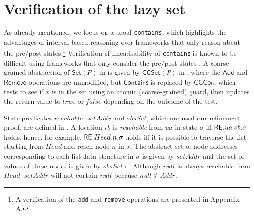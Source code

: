 \documentclass{article}
\def \reachable{{\sf RE}}
\theoremstyle{plain}
\theoremstyle{definition}
\begin{document}
\section{Verification of the lazy set}
\label{sec:verif-lazy-set}


As already mentioned, we focus on a proof {\tt contains}, which
highlights the advantages of interval-based reasoning over frameworks
that only reason about the pre/post states.\footnote{A verification of
  the {\tt add} and {\tt remove} operations are presented in Appendix
  A.}  Verification of linearisability of \texttt{contains} is known
to be difficult using frameworks that only consider the pre/post
states \cite{Vaf10,VHHS06,CGLM06,DSW11}. A coarse-grained abstraction
of $\mathsf{Set}(P)$ in  is given by
$\mathsf{CGSet}(P)$ in , where the $\mathsf{Add}$ and
$\mathsf{Remove}$ operations are unmodified, but $\mathsf{Contains}$
is replaced by $\mathsf{CGCon}$, which tests to see if $x$ is in the
set using an atomic (coarse-grained) guard, then updates the return
value to $true$ or $false$ depending on the outcome of the test.

State predicates $reachable$, $setAddr$ and $absSet$, which are used
our refinement proof, are defined in . A location
$vb$ is \emph{reachable} from $ua$ in state $\sigma$ iff
$\reachable.ua.vb.\sigma$ holds, hence, for example,
$\reachable.Head.n.\sigma$ holds iff it is possible to traverse the
list starting from $Head$ and reach node $n$ in $\sigma$. The abstract
set of node addresses corresponding to each list data structure in
$\sigma$ is given by $setAddr$ and the set of values of these nodes is
given by $absSet.\sigma$. Although $null$ is always reachable from
$Head$, $setAddr$ will not contain $null$ because $null \notin Addr$.
\end{document}
